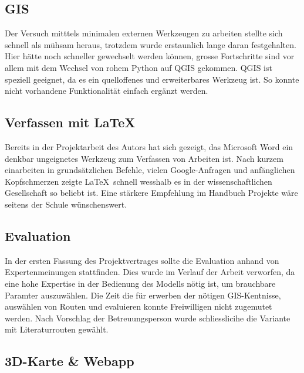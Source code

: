 \subsection{GIS}

Der Versuch mitttels minimalen externen Werkzeugen zu arbeiten stellte sich schnell als mühsam heraus, trotzdem wurde erstaunlich lange daran festgehalten. Hier hätte noch schneller gewechselt werden können, grosse Fortschritte sind vor allem mit dem Wechsel von rohem Python auf QGIS gekommen. QGIS ist speziell geeignet, da es ein quelloffenes und erweiterbares Werkzeug ist. So konnte nicht vorhandene Funktionalität einfach ergänzt werden.

\subsection{Verfassen mit \LaTeX}
Bereits in der Projektarbeit des Autors hat sich gezeigt, das Microsoft Word ein denkbar ungeignetes Werkzeug zum Verfassen von Arbeiten ist. Nach kurzem einarbeiten in grundsätzlichen Befehle, vielen Google-Anfragen und anfänglichen Kopfschmerzen zeigte \LaTeX\ schnell wesshalb es in der wissenschaftlichen Gesellschaft so beliebt ist. Eine stärkere Empfehlung im Handbuch Projekte wäre seitens der Schule wünschenswert.

\subsection{Evaluation}

In der ersten Fassung des Projektvertrages sollte die Evaluation anhand von Expertenmeinungen stattfinden. Dies wurde im  Verlauf der Arbeit verworfen, da eine hohe Expertise in der Bedienung des Modells nötig ist, um brauchbare Paramter auszuwählen. Die Zeit die für erwerben der nötigen GIS-Kentnisse, auswählen von Routen und evaluieren konnte Freiwilligen nicht zugemutet werden. Nach Vorschlag der Betreuungsperson wurde schliesslicihe die Variante mit Literaturrouten gewählt.

\subsection{3D-Karte \& Webapp}

